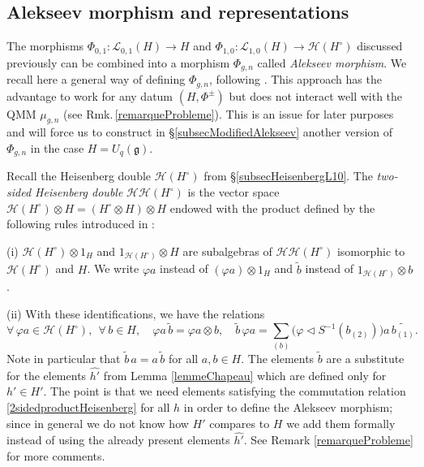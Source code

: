 \documentclass[11pt]{amsart}
\begin{document}
\subsection{Alekseev morphism and representations}\label{subsecAlekseev}
\indent The morphisms $\Phi_{0,1} : \mathcal{L}_{0,1}(H) \to H$ and $\Phi_{1,0} : \mathcal{L}_{1,0}(H) \to \mathcal{H}(H^\circ)$ discussed previously can be combined into a morphism $\Phi_{g,n}$ called {\em Alekseev morphism}. We recall here a general way of defining $\Phi_{g,n}$, following \cite[\S 5]{BFR}. This approach has the advantage to work for any datum $(H,\Phi^\pm)$ but does not interact well with the QMM $\mu_{g,n}$ (see Rmk.\,\ref{remarqueProbleme}). This is an issue for later purposes and will force us to construct in \S\ref{subsecModifiedAlekseev} another version of $\Phi_{g,n}$ in the case $H = U_q(\mathfrak{g})$.

\smallskip

\indent  Recall the Heisenberg double $\mathcal{H}(H^\circ)$ from \S\ref{subsecHeisenbergL10}. The {\em two-sided Heisenberg double} $\mathcal{HH}(H^\circ)$ is the vector space $\mathcal{H}(H^\circ) \otimes H = (H^\circ \otimes H) \otimes H$ endowed with the product defined by the following rules introduced in \cite[\S 5.1]{BFR}:

\indent (i) $\mathcal{H}(H^\circ) \otimes 1_H$ and $1_{\mathcal{H}(H^\circ)} \otimes H$ are subalgebras of $\mathcal{HH}(H^{\circ})$ isomorphic to $\mathcal{H}(H^\circ)$ and $H$. We write $\varphi a$ instead of $(\varphi a) \otimes 1_H $ and $\widetilde{b}$ instead of $1_{\mathcal{H}(H^\circ)} \otimes b$.

\indent (ii) With these identifications, we have the relations 
\begin{equation}\label{2sidedproductHeisenberg}
\forall \, \varphi a \in \mathcal{H}(H^\circ), \:\: \forall \, b \in H, \quad  \varphi a \, \widetilde{b} = \varphi a \otimes b, \quad \widetilde{b}\,\varphi a = \sum_{(b)}\bigl( \varphi \lhd S^{-1}(b_{(2)})\bigr)a \, \widetilde{b_{(1)}}.
\end{equation}
Note in particular that $\widetilde{b}\,a = a \,\widetilde{b}$ for all $a,b \in H$. The elements $\widetilde{b}$ are a substitute for the elements $\widehat{h'}$ from Lemma \ref{lemmeChapeau} which are defined only for $h' \in H'$. The point is that we need elements satisfying the commutation relation \eqref{2sidedproductHeisenberg} for all $h$ in order to define the Alekseev morphism; since in general we do not know how $H'$ compares to $H$ we add them formally instead of using the already present elements $\widehat{h'}$. See Remark \ref{remarqueProbleme} for more comments.
\end{document}

